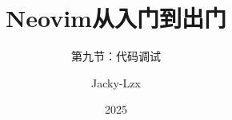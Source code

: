\documentclass[17pt]{ctexbeamer}
\title{Neovim从入门到出门}
\subtitle{第九节：代码调试}
\author{Jacky-Lzx}
\date{2025}
\begin{document}
\begin{frame}
  \titlepage
\end{frame}
\end{document}
